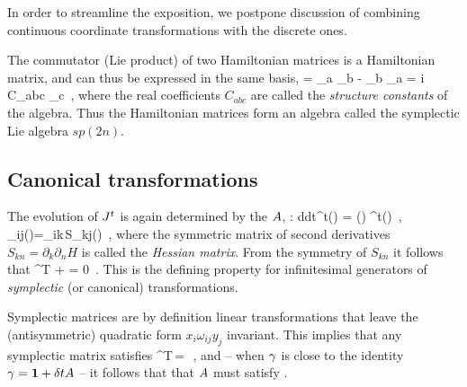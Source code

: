 In order to streamline the exposition, we
postpone discussion of combining continuous coordinate
transformations with the discrete ones.

The commutator (Lie product) of two Hamiltonian matrices is a Hamiltonian
matrix, and can thus be expressed in the same basis,
\beq
[\Lg_a, \Lg_b]
	=
\Lg_a \Lg_b - \Lg_b \Lg_a
	=
i C_{abc} \Lg_c
\,,
where the real coefficients $C_{abc}$ are called the \emph{structure
constants} of the algebra. Thus the Hamiltonian matrices form an algebra
called the symplectic Lie algebra $sp(2n)$.

\subsection{Canonical transformations}
\label{sect:CanonTransf}

The
evolution of $\jMps^t$  is again determined by
the {\stabmat} $\Mvar$, :
\beq
{d\over dt}\jMps^t(\pSpace) = \Mvar(\pSpace)
\jMps^t(\pSpace)
\,, \qquad
\Mvar_{ij}(\pSpace)={\omega}_{ik}\,S_{kj}(\pSpace)
\,,
where the symmetric matrix of second derivatives
$S_{kn} = \partial_k \partial_n H$
is called the {\em Hessian matrix}.
From
the symmetry of $S_{kn}$
it follows that
\beq
 \Mvar^T {\bf \omega} + {\bf \omega} \Mvar = 0
\,.
This is the defining property  for infinitesimal
generators of {\em symplectic} (or canonical) transformations.

Symplectic matrices are by definition linear transformations that leave
the (antisymmetric) quadratic form $x_i \omega_{ij} y_j$ invariant. This
implies that any symplectic matrix satisfies
\beq
\LieEl^T\omega \LieEl \,=\, \omega
\,,
\label{sympQ}
\eeq
and -- when $\gamma$ is close to the identity $\gamma={\bf 1} + \delta t
A$ -- it follows that that $A$ must satisfy .

